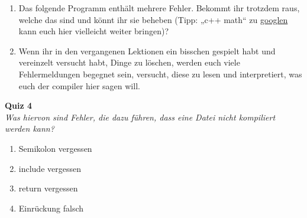 
\begin{spiel}
	\begin{enumerate}
		\item Das folgende Programm enthält mehrere Fehler. Bekommt ihr trotzdem
		      raus, welche das sind und könnt ihr sie beheben (Tipp: „c++ math“ zu
		      \href{https://lmgtfy.com/?q=c\%2B\%2B+math}{googlen} kann euch hier vielleicht weiter bringen)?
		\item Wenn ihr in den vergangenen Lektionen ein bisschen gespielt habt und
		      vereinzelt versucht habt, Dinge zu löschen, werden euch viele
		      Fehlermeldungen begegnet sein, versucht, diese zu lesen und
		      interpretiert, was euch der compiler hier sagen will.
	\end{enumerate}
\end{spiel}


\textbf{Quiz 4}\\
\textit{Was hiervon sind Fehler, die dazu führen, dass eine Datei nicht kompiliert werden kann?}
\begin{enumerate}[label=\alph*)]
	\item Semikolon vergessen
	\item include vergessen
	\item return vergessen
	\item Einrückung falsch
\end{enumerate}

